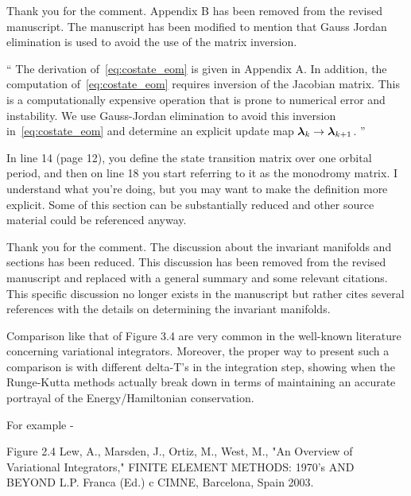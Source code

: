\documentclass[11pt]{article}
\newenvironment{correction}{\begin{list}{}{\setlength{\leftmargin}{1cm}\setlength{\rightmargin}{1cm}}\vspace{\parsep}\item[]``}{''\end{list}}
\begin{document}
\begin{enumerate}
Thank you for the comment.
Appendix B has been removed from the revised manuscript.
The manuscript has been modified to mention that Gauss Jordan elimination is used to avoid the use of the matrix inversion.

\begin{correction}
The derivation of~\cref{eq:costate_eom} is given in Appendix A.
In addition, the computation of~\cref{eq:costate_eom} requires inversion of the Jacobian matrix.
This is a computationally expensive operation that is prone to numerical error and instability.
We use Gauss-Jordan elimination to avoid this inversion in~\cref{eq:costate_eom} and determine an explicit update map \( \bm{\lambda}_k \to \bm{\lambda}_{k+1} \).
\end{correction}

\item 
    \begin{itshape}
In line 14 (page 12), you define the state transition matrix over one orbital period, and then on line 18 you start referring to it as the monodromy matrix.  I understand what you're doing, but you may want to make the definition more explicit.  Some of this section can be substantially reduced and other source material could be referenced anyway.
\end{itshape}

Thank you for the comment.
The discussion about the invariant manifolds and \Poincare sections has been reduced.
This discussion has been removed from the revised manuscript and replaced with a general summary and some relevant citations.
This specific discussion no longer exists in the manuscript but rather cites several references with the details on determining the invariant manifolds.

\item 
    \begin{itshape}
Comparison like that of Figure 3.4 are very common in the well-known literature concerning variational integrators.  Moreover, the proper way to present such a comparison is with different delta-T's in the integration step, showing when the Runge-Kutta methods actually break down in terms of maintaining an accurate portrayal of the Energy/Hamiltonian conservation.

For example -

Figure 2.4
Lew, A., Marsden, J., Ortiz, M., West, M., "An Overview of Variational Integrators," FINITE ELEMENT METHODS: 1970's AND BEYOND L.P. Franca (Ed.) c CIMNE, Barcelona, Spain 2003.


\end{itshape}
\end{enumerate}
\end{document}
